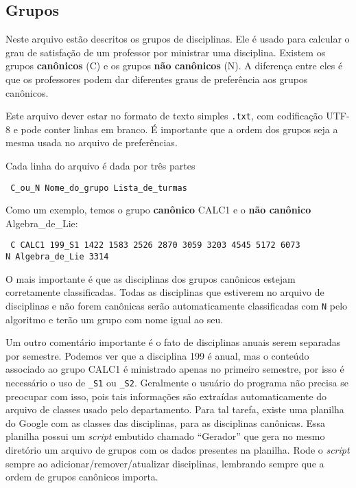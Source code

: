 \documentclass[a4paper, 12pt]{report}
\begin{document}
\subsection{Grupos} \label{conf:grupos}

Neste arquivo estão descritos os grupos de disciplinas. Ele é usado
para calcular o grau de satisfação de um professor por ministrar uma
disciplina. Existem os grupos \textbf{canônicos} (C) e os grupos
\textbf{não canônicos} (N). A diferença entre eles é que os
professores podem dar diferentes graus de preferência aos grupos
canônicos.

Este arquivo dever estar no formato de texto simples \texttt{.txt},
com codificação UTF-8 e pode conter linhas em branco. É importante que
a ordem dos grupos seja a mesma usada no arquivo de preferências.

Cada linha do arquivo é dada por três partes
\begin{center} \tt
  C\_ou\_N Nome\_do\_grupo Lista\_de\_turmas
\end{center}

Como um exemplo, temos o grupo \textbf{canônico} CALC1 e o \textbf{não
  canônico} Algebra\_de\_Lie:
\begin{flushleft} \tt
C CALC1 199\_S1 1422 1583 2526 2870 3059 3203 4545 5172 6073\\
N Algebra\_de\_Lie	3314
\end{flushleft}
O mais importante é que as disciplinas dos grupos canônicos estejam
corretamente classificadas. Todas as disciplinas que estiverem no
arquivo de disciplinas e não forem canônicas serão automaticamente
classificadas com \texttt{N} pelo algoritmo e terão um grupo com nome
igual ao seu.

Um outro comentário importante é o fato de disciplinas anuais serem
separadas por semestre. Podemos ver que a disciplina 199 é anual, mas
o conteúdo associado ao grupo CALC1 é ministrado apenas no primeiro
semestre, por isso é necessário o uso de \texttt{\_S1} ou
\texttt{\_S2}. Geralmente o usuário do programa não precisa se
preocupar com isso, pois tais informações são extraídas
automaticamente do arquivo de classes usado pelo departamento. Para
tal tarefa, existe uma planilha do Google com as classes das
disciplinas, para as disciplinas canônicas. Essa planilha possui um
\textit{script} embutido chamado ``Gerador'' que gera no mesmo
diretório um arquivo de grupos com os dados presentes na
planilha. Rode o \textit{script} sempre ao adicionar/remover/atualizar
disciplinas, lembrando sempre que a ordem de grupos canônicos importa.
\end{document}
